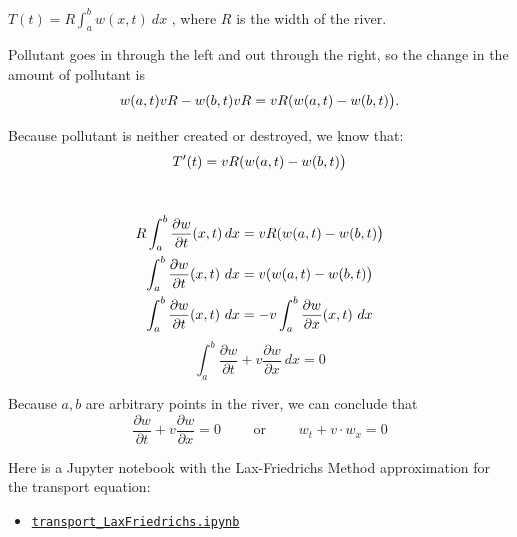\begin{solution}
\begin{slide}

\begin{parts}
	\item $\displaystyle T(t) = R \int_a^b w(x,t) ~dx$	, 	where $R$ is the width of the river.
	\item Pollutant goes in through the left and out through the right, so the change in the amount of pollutant is
	\[
	w(a,t) v R - w(b,t) v R = v R \bigskip(w(a,t) - w(b,t)\big).
	\]

	\item Because pollutant is neither created or destroyed, we know that:
	\[T'(t) = v R \bigskip(w(a,t) - w(b,t)\big) \]
	
	\begin{slidesonly}
	\vspace{3cm}
	\end{slidesonly}	
	
	\item \hfil \\[-35pt]
	\begin{align*}
		R \int_a^b \frac{\partial w}{ \partial t} (x,t) \, dx & = v R \bigskip(w(a,t) - w(b,t)\big) \\
		\int_a^b \frac{\partial w}{ \partial t} (x,t) ~dx & = v \bigskip(w(a,t) - w(b,t)\big) \\
		\int_a^b \frac{\partial w}{ \partial t} (x,t) ~dx & = -v \int_a^b \frac{\partial w}{\partial x} (x,t) ~dx
	\end{align*}
	\[
	\int_a^b \frac{\partial w}{ \partial t} + v \frac{\partial w}{ \partial x} ~dx = 0
	\]
	
	Because $a,b$ are arbitrary points in the river, we can conclude that
	\[ 
	\frac{\partial w}{ \partial t} + v \frac{\partial w}{ \partial x} = 0
	\qquad \text{ or } \qquad 
	w_t + v \cdot w_x = 0
	\]
	
\end{parts}

	Here is a Jupyter notebook with the Lax-Friedrichs Method approximation for the transport equation:
	\begin{itemize}
		\item \href{https://utoronto.syzygy.ca/jupyter/user-redirect/git-pull?repo=https://github.com/bigfatbernie/IBLMathModeling&subPath=book/python/transport_LaxFriedrichs.ipynb}{\tt transport\_LaxFriedrichs.ipynb}
	\end{itemize}
	
\end{slide}
	
\end{solution}


